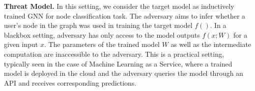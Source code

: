 \noindent\textbf{Threat Model.} In this setting, we consider the target model as inductively trained GNN for node classification task.
The adversary aims to infer whether a user's node in the graph was used in training the target model $f()$.
In a blackbox setting, adversary has only access to the model outputs $f(x;W)$ for a given input $x$.
The parameters of the trained model $W$ as well as the intermediate computation are inaccessible to the adversary.
This is a practical setting, typically seen in the case of Machine Learning as a Service, where a trained model is deployed in the cloud and the adversary queries the model through an API and receives corresponding predictions.


\begin{figure}[!htb]
    \centering
    \begin{minipage}[b]{1\linewidth}
    \centering


\end{minipage}
\end{figure}
